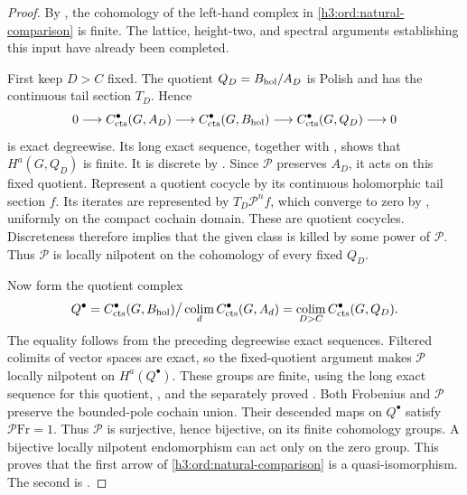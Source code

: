 \begin{proof}
By , the cohomology of the
left-hand complex in \eqref{h3:ord:natural-comparison} is finite.
The lattice, height-two, and spectral arguments establishing this input
have already been completed.

First keep $D>C$ fixed.  The quotient
$Q_D=B_{\mathrm{hol}}/A_D$ is Polish and has the continuous tail section
$T_D$.  Hence
\[
 0\longrightarrow C^\bullet_{\mathrm{cts}}(G,A_D)
 \longrightarrow C^\bullet_{\mathrm{cts}}(G,B_{\mathrm{hol}})
 \longrightarrow C^\bullet_{\mathrm{cts}}(G,Q_D)\longrightarrow0
\]
is exact degreewise.  Its long exact sequence, together with
,
shows that $H^a(G,Q_D)$ is finite.  It is discrete by
.  Since $\mathcal P$ preserves $A_D$, it
acts on this fixed quotient.
Represent a quotient cocycle by its continuous holomorphic tail
section $f$.  Its iterates are represented by
$T_D\mathcal P^nf$, which converge to zero by
, uniformly on the compact cochain domain.
These are quotient cocycles.  Discreteness therefore implies that the
given class is killed by some power of $\mathcal P$.
Thus $\mathcal P$ is locally nilpotent on the cohomology of every
fixed $Q_D$.

Now form the quotient complex
\[
 Q^\bullet=
 C^\bullet_{\mathrm{cts}}(G,B_{\mathrm{hol}})\big/
       \operatorname*{colim}_d C^\bullet_{\mathrm{cts}}(G,A_d)
   =\operatorname*{colim}_{D>C}C^\bullet_{\mathrm{cts}}(G,Q_D).
\]
The equality follows from the preceding degreewise exact sequences.
Filtered colimits of vector spaces are exact, so the fixed-quotient
argument makes $\mathcal P$ locally nilpotent on $H^a(Q^\bullet)$.
These groups are finite, using the long exact sequence for this
quotient, , and the separately
proved .
Both Frobenius and $\mathcal P$ preserve the bounded-pole cochain
union.  Their descended maps on $Q^\bullet$ satisfy
$\mathcal P\mathrm{Fr}=1$.  Thus $\mathcal P$ is surjective,
hence bijective, on its finite cohomology groups.  A bijective locally
nilpotent endomorphism can act only on the zero group.  This proves
that the first arrow of \eqref{h3:ord:natural-comparison} is a
quasi-isomorphism.  The second is
.


\end{proof}
